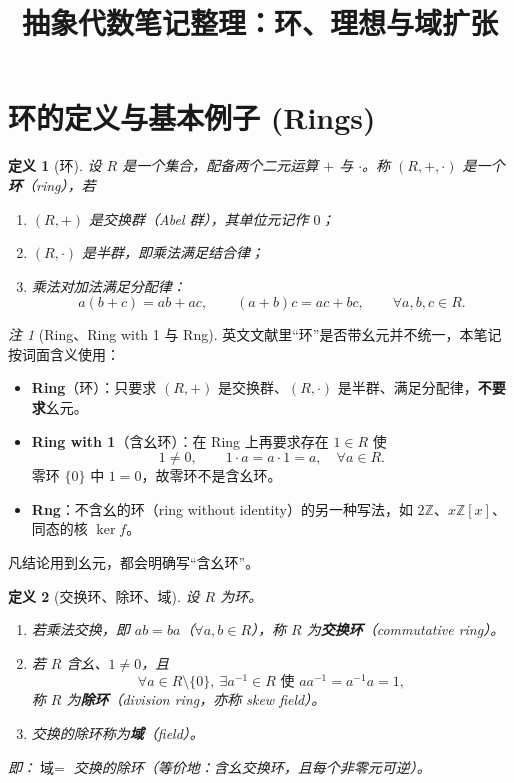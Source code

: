 \documentclass[11pt,a4paper]{ctexart}
\title{抽象代数笔记整理：环、理想与域扩张}
\author{}
\date{}
\makeatletter
\newtheorem*{definition}{定义}
\theoremstyle{remark}
\newtheorem*{remark}{注}
\renewcommand{\maketitle}{%
    \par
    \begingroup
    \raggedright
    \vspace{1em}
    {\LARGE\bfseries \@title \par}%
    \vspace{0.5em}
    {\large \@author \par}%
    \vspace{0.5em}
    {\large \@date \par}%
    \vspace{1em}
    \endgroup
    \par
}
\makeatother
\begin{document}
\maketitle

\section*{环的定义与基本例子 (Rings)}

\begin{definition}[环]
设 $R$ 是一个集合，配备两个二元运算 $+$ 与 $\cdot$。称 $(R,+,\cdot)$ 是一个\textbf{环}（ring），若
\begin{enumerate}
    \item $(R,+)$ 是交换群（Abel 群），其单位元记作 $0$；
    \item $(R,\cdot)$ 是半群，即乘法满足结合律；
    \item 乘法对加法满足分配律：
    \[
    a(b+c)=ab+ac,\qquad (a+b)c=ac+bc,\qquad \forall a,b,c\in R.
    \]
\end{enumerate}
\end{definition}

\begin{remark}[Ring、Ring with 1 与 Rng]
英文文献里“环”是否带幺元并不统一，本笔记按词面含义使用：
\begin{itemize}
    \item \textbf{Ring}（环）：只要求 $(R,+)$ 是交换群、$(R,\cdot)$ 是半群、满足分配律，\textbf{不要求}幺元。
    \item \textbf{Ring with 1}（含幺环）：在 Ring 上再要求存在 $1\in R$ 使
    \[
    1\neq 0,\qquad 1\cdot a=a\cdot 1=a,\quad \forall a\in R .
    \]
    零环 $\{0\}$ 中 $1=0$，故零环不是含幺环。
    \item \textbf{Rng}：不含幺的环（ring without identity）的另一种写法，如 $2\mathbb{Z}$、$x\mathbb{Z}[x]$、同态的核 $\ker f$。
\end{itemize}
凡结论用到幺元，都会明确写“含幺环”。
\end{remark}

\begin{definition}[交换环、除环、域]
设 $R$ 为环。
\begin{enumerate}
    \item 若乘法交换，即 $ab=ba$（$\forall a,b\in R$），称 $R$ 为\textbf{交换环}（commutative ring）。
    \item 若 $R$ 含幺、$1\neq 0$，且
    \[
    \forall a\in R\setminus\{0\},\ \exists a^{-1}\in R \text{ 使 } aa^{-1}=a^{-1}a=1,
    \]
    称 $R$ 为\textbf{除环}（division ring，亦称 skew field）。
    \item 交换的除环称为\textbf{域}（field）。
\end{enumerate}
即：$\text{域}=$ 交换的除环（等价地：含幺交换环，且每个非零元可逆）。
\end{definition}
\end{document}
